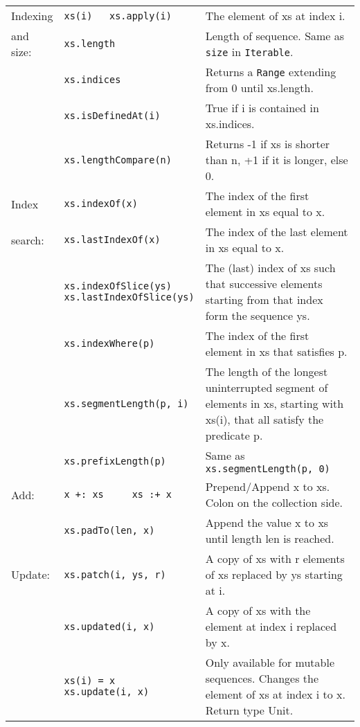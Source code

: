 \documentclass[article, a5paper]{memoir}
\renewcommand{\arraystretch}{0.9}
\begin{document}
{\small\renewcommand{\arraystretch}{1.1}
\begin{tabular}{@{}l p{3.75cm} p{6.8cm}}


  Indexing & \texttt{xs(i)  ~ xs.apply(i)} & The element of xs at index i.\\   \cline{2-3}

  and size: & \texttt{xs.length} & Length of sequence. Same as \texttt{size} in \texttt{Iterable}.\\\cline{2-3}
  & \texttt{xs.indices} & Returns a \texttt{Range} extending from 0 until xs.length.\\\cline{2-3}
  & \texttt{xs.isDefinedAt(i)} & True if i is contained in xs.indices.\\\cline{2-3}
  & \texttt{xs.lengthCompare(n)} & Returns -1 if xs is shorter than n, +1 if it is longer, else 0. \\\cline{1-3}


  Index & \texttt{xs.indexOf(x)} & The index of the first element in xs equal to x.\\   \cline{2-3}
  search: & \texttt{xs.lastIndexOf(x)} & The index of the last element in xs equal to x.\\\cline{2-3}
   & \texttt{xs.indexOfSlice(ys) \newline xs.lastIndexOfSlice(ys)} & The (last) index of xs such that successive elements starting from that index form the sequence ys.\\\cline{2-3}
   & \texttt{xs.indexWhere(p)} & The index of the first element in xs that satisfies p.\\\cline{2-3}
   & \texttt{xs.segmentLength(p, i)} & The length of the longest uninterrupted segment of elements in xs, starting with xs(i), that all satisfy the predicate p.\\\cline{2-3}
   & \texttt{xs.prefixLength(p)} &  	Same as \texttt{ xs.segmentLength(p, 0)}\\\cline{1-3}


  Add: & {\texttt{x~+:~xs~~~~~xs~:+~x}}  & Prepend/Append x to xs. Colon on the collection side. \\   \cline{2-3}
   & \texttt{xs.padTo(len, x)} & Append the value x to xs until length len is reached.\\\cline{1-3}


  Update: & \texttt{xs.patch(i, ys, r)} &  A copy of xs with r elements of xs replaced by ys starting at i. \\   \cline{2-3}
   & \texttt{xs.updated(i, x)} & A copy of xs with the element at index i replaced by x.\\\cline{2-3}
   & \texttt{xs(i) = x \newline xs.update(i, x)} & Only available for mutable sequences. Changes the element of xs at index i to x. Return type Unit.\\\cline{1-3}



\end{tabular}}
\end{document}
